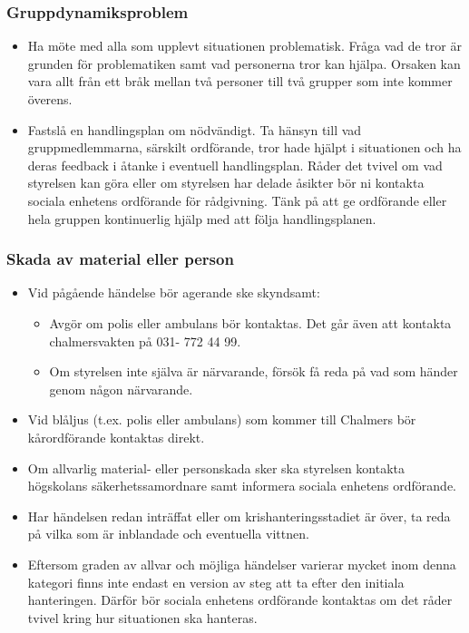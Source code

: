 \documentclass[a4paper]{dtek}
\begin{document}
\subsubsection{Gruppdynamiksproblem}
\begin{itemize}
    \item Ha möte med alla som upplevt situationen problematisk. Fråga vad de tror är grunden för problematiken samt vad personerna tror kan hjälpa. Orsaken kan vara allt från ett bråk mellan två personer till två grupper som inte kommer överens. 

    \item Fastslå en handlingsplan om nödvändigt. Ta hänsyn till vad gruppmedlemmarna, särskilt ordförande,  tror hade hjälpt i situationen och ha deras feedback i åtanke i eventuell handlingsplan. Råder det tvivel om  vad styrelsen kan göra eller om styrelsen har delade åsikter bör ni kontakta sociala enhetens  ordförande för rådgivning. Tänk på att ge ordförande eller hela gruppen kontinuerlig hjälp med att följa handlingsplanen.
\end{itemize}

\subsubsection{Skada av material eller person}
\begin{itemize}
    \item Vid pågående händelse bör agerande ske skyndsamt: 
    \begin{itemize}
        \item Avgör om polis eller ambulans bör kontaktas. Det går även att kontakta  
        chalmersvakten på 031- 772 44 99.
        \item Om styrelsen inte själva är närvarande, försök få reda på vad som händer genom någon närvarande. 
    \end{itemize}
    \item Vid blåljus (t.ex. polis eller ambulans) som kommer till Chalmers bör kårordförande kontaktas direkt.
    \item Om allvarlig material- eller personskada sker ska styrelsen kontakta högskolans säkerhetssamordnare samt informera sociala enhetens ordförande.
    \item Har händelsen redan inträffat eller om krishanteringsstadiet är över, ta reda på vilka som är inblandade och eventuella vittnen.
    \item Eftersom graden av allvar och möjliga händelser varierar mycket inom denna kategori finns  inte endast en version av steg att ta efter den initiala hanteringen. Därför bör sociala enhetens ordförande kontaktas om det råder tvivel kring hur situationen ska hanteras.
\end{itemize}
\end{document}
